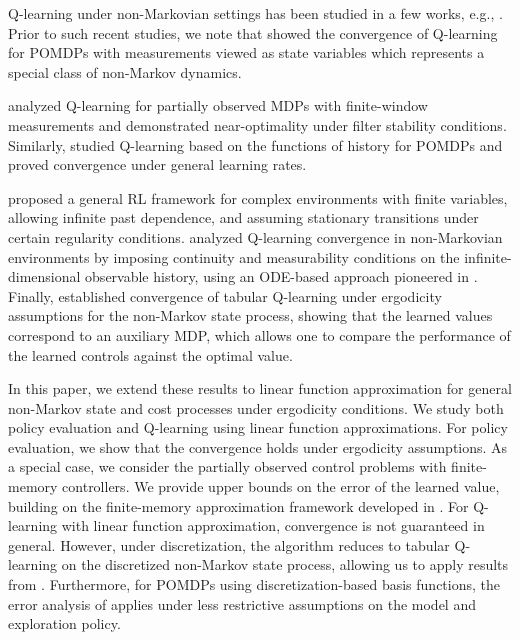 \documentclass[11pt]{article}
\begin{document}
Q-learning under non-Markovian settings has been studied in a few works, e.g., \cite{dong2022simple, chandak2022reinforcement, kara2021convergence, kara2024qlearning, sinha2024periodic}. Prior to such recent studies, we note that \cite{singh1994learning} showed the convergence of Q-learning for POMDPs with measurements viewed as state variables which represents a special class of non-Markov dynamics.


\cite{kara2021convergence} analyzed Q-learning for partially observed MDPs with finite-window measurements and demonstrated near-optimality under filter stability conditions. Similarly, \cite{sinha2024periodic} studied Q-learning based on the functions of history for POMDPs and proved convergence under general learning rates.

\cite{dong2022simple} proposed a general RL framework for complex environments with finite variables, allowing infinite past dependence, and assuming stationary transitions under certain regularity conditions. \cite{chandak2022reinforcement} analyzed Q-learning convergence in non-Markovian environments by imposing continuity and measurability conditions on the infinite-dimensional observable history, using an ODE-based approach pioneered in \cite{borkar2000ode}. Finally, \cite{kara2024qlearning} established convergence of tabular Q-learning under ergodicity assumptions for the non-Markov state process, showing that the learned values correspond to an auxiliary MDP,  which allows one to compare the performance of the learned controls against the optimal value. 

In this paper, we extend these results to linear function approximation for general non-Markov state and cost processes under ergodicity conditions. We study both policy evaluation and Q-learning using linear function approximations. For policy evaluation, we show that the convergence holds under ergodicity assumptions. As a special case, we consider the partially observed control problems with finite-memory controllers. We provide upper bounds on the error of the learned value, building on the finite-memory approximation framework
developed in \cite{kara2020near,kara2023convergence}. For Q-learning with linear function approximation, convergence is not guaranteed in general. However, under discretization, the algorithm reduces to tabular Q-learning on the discretized non-Markov state process, allowing us to apply results from \cite{kara2024qlearning}. Furthermore, for POMDPs using discretization-based basis functions, the error analysis of \cite{devran2025near} applies under less restrictive assumptions on the model and exploration policy.
\end{document}
